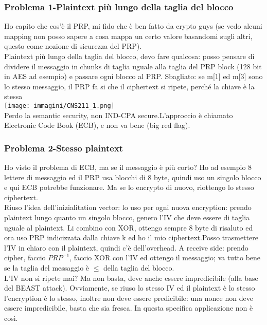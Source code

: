 \documentclass[16px]{article}
\begin{document}
\subsubsection{Problema 1-Plaintext più lungo della taglia del blocco}
Ho capito che cos'è il PRP, mi fido che è ben fatto da crypto guys (se vedo alcuni mapping non posso sapere a cosa mappa un certo valore basandomi sugli altri, questo come nozione di sicurezza del PRP).\\ Plaintext più lungo della taglia del blocco, devo fare qualcosa: posso pensare di dividere il messaggio in chunks di taglia uguale alla taglia del PRP block (128 bit in AES ad esempio) e passare ogni blocco al PRP. Sbagliato: se m[1] ed m[3] sono lo stesso messaggio, il PRP fa si che il ciphertext si ripete, perché la chiave è la stessa\\
\texttt{[image: immagini/CNS211\_1.png]}\\ Perdo la semantic security, non IND-CPA secure.L'approccio è chiamato Electronic Code Book (ECB), e non va bene (big red flag).
\subsubsection{Problema 2-Stesso plaintext}
Ho visto il problema di ECB, ma se il messaggio è più corto? Ho ad esempio 8 lettere di messaggio ed il PRP usa blocchi di 8 byte, quindi uso un singolo blocco e qui ECB potrebbe funzionare. Ma se lo encrypto di nuovo, riottengo lo stesso ciphertext.\\ Riuso l'idea dell'inizialitation vector: lo uso per ogni nuova encryption: prendo plaintext lungo quanto un singolo blocco, genero l'IV che deve essere di taglia uguale al plaintext. Li combino con XOR, ottengo sempre 8 byte di risaluto ed ora uso PRP indicizzata dalla chiave k ed ho il mio ciphertext.Posso trasmettere l'IV in chiaro con il plaintext, quindi c'è dell'overhead. A receive side: prendo cipher, faccio $PRP^{-1}$, faccio XOR con l'IV ed ottengo il messaggio; va tutto bene se la taglia del messaggio è $\leq$ della taglia del blocco.\\ L'IV non si ripete mai? Ma non basta, deve anche essere impredicibile (alla base del BEAST attack). Ovviamente, se riuso lo stesso IV ed il plaintext è lo stesso l'encryption è lo stesso, inoltre non deve essere predicibile: una nonce non deve essere impredicibile, basta che sia fresca. In questa specifica applicazione non è così.
\end{document}
